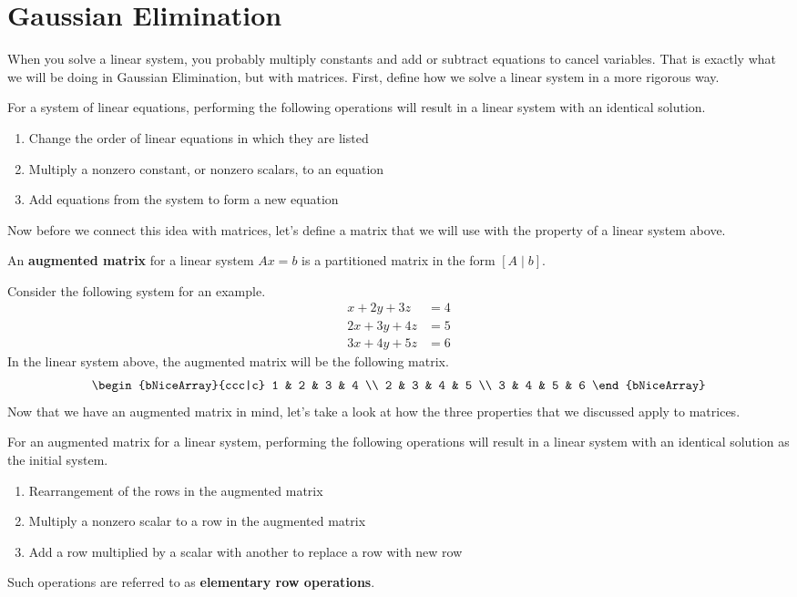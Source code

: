 \documentclass[../../main.tex]{subfiles}
\begin{document}
\section{Gaussian Elimination}

When you solve a linear system, you probably multiply constants
and add or subtract equations to cancel variables. That is exactly
what we will be doing in Gaussian Elimination, but with matrices.
First, define how we solve a linear system in a more rigorous way.

\begin{definition}{}{}
For a system of linear equations, performing the following operations
will result in a linear system with an identical solution.
\begin{enumerate}[noitemsep]
\item
Change the order of linear equations in which they are listed
\item
Multiply a nonzero constant, or nonzero scalars, to an equation
\item
Add equations from the system to form a new equation
\end{enumerate}
\end{definition}

Now before we connect this idea with matrices, let's define a matrix
that we will use with the property of a linear system above.

\begin{definition}{}{}
An \textbf{augmented matrix} for a linear system $Ax = b$ is a
partitioned matrix in the form $[A \mid b]$.
\end{definition}

Consider the following system for an example.
\begin{align*}
    x + 2y + 3z &= 4 \\
    2x + 3y + 4z &= 5 \\
    3x + 4y + 5z &= 6
\end{align*}
In the linear system above, the augmented matrix will be the following
matrix.
\[
\begin{bNiceArray}{ccc|c}
    1 & 2 & 3 & 4 \\
    2 & 3 & 4 & 5 \\
    3 & 4 & 5 & 6
\end{bNiceArray}
\]
Now that we have an augmented matrix in mind, let's take a look at
how the three properties that we discussed apply to matrices.

\begin{definition}{}{}
For an augmented matrix for a linear system, performing the following
operations will result in a linear system with an identical solution
as the initial system.
\begin{enumerate}[noitemsep]
\item[$R_1$.]
Rearrangement of the rows in the augmented matrix
\item[$R_2$.]
Multiply a nonzero scalar to a row in the augmented matrix
\item[$R_3$.]
Add a row multiplied by a scalar with another to replace a row with
new row
\end{enumerate}
Such operations are referred to as \textbf{elementary row operations}.
\end{definition}
\end{document}
